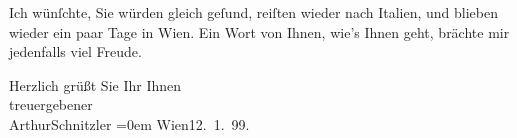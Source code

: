 \pstart
           Ich wünſchte, Sie würden gleich geſund, reiſten wieder nach Italien, und blieben wieder ein paar Tage in Wien. Ein Wort von Ihnen, wie’s Ihnen geht, brächte mir
               jedenfalls viel Freude.\pend
           
\pstart
           Herzlich grüßt Sie Ihr Ihnen {\\[\baselineskip]}treuergebener{\\[\baselineskip]}\spacefill\mbox{ArthurSchnitzler}\pend
           \leftskip=0em{}
\pstart
           Wien12. 1. 99.\pend
           \endnumbering{}  \newcommand{\dateiname}{L00880}\newcommand{\titel}{Arthur Schnitzler an Georg Brandes, 12. 1. 1899}\newcommand{\editorInnen}{Martin Anton Müller und Gerd-Hermann Susen}
